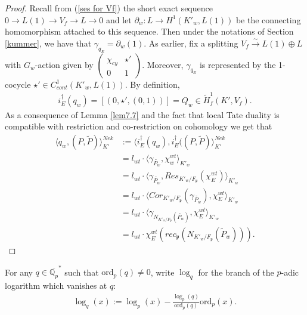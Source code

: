 \documentclass[reqno,10pt]{amsart}
\newcommand{\qp}{\mathbb{Q}_{p}}
\newcommand{\p}{\mathfrak{p}}
\theoremstyle{plain}
\theoremstyle{definition}
\begin{document}
\begin{proof}
    Recall from (\ref{ses for Vf}) the short exact sequence $0 \rightarrow L(1) \rightarrow V_f \rightarrow L \rightarrow 0$ and let $\partial_w : L \rightarrow H^1(K'_w,L(1))$ be the connecting homomorphism attached to this sequence. Then under the notations of Section \ref{kummer}, we have that $\gamma_{q_E} = \partial_w(1)$. As earlier, fix a splitting $V_f \xrightarrow{\sim} L(1) \oplus L$ with $G_w$-action given by
    $\begin{pmatrix}
        \chi_{cy} & \star' \\
        0 & 1
    \end{pmatrix}$.
    Moreover, $\gamma_{q_E}$ is represented by the 1-cocycle $\star' \in C^1_{cont}(K'_w,L(1))$. By definition,
    \begin{align*}
        i_E^\dagger(q_w) = [(0,\star',(0,1))] = Q_w \in \widetilde{H}^1_f(K',V_f).
    \end{align*}
     As a consequence of Lemma \ref{lem7.7} and the fact that local Tate duality is compatible with restriction and co-restriction on cohomology we get that
    \begin{align*}
        \langle q_w, (P,\widetilde{P}) \rangle^{Nek}_{K'} & := \langle i_E^\dagger(q_w), i_E^\dagger((P,\widetilde{P}) \rangle^{Nek}_{K'} \\
        & = l_{wt} \cdot \langle \gamma_{\widetilde{P_w}},\chi_w^{wt} \rangle_{K'_w} \\
        & = l_{wt} \cdot \langle \gamma_{\widetilde{P_w}},Res_{K'_w/F_\p}(\chi_E^{wt}) \rangle_{K'_w} \\
        & = l_{wt} \cdot \langle Cor_{K'_w/F_\p}(\gamma_{\widetilde{P_w}}),\chi_E^{wt} \rangle_{K'_w} \\
        & = l_{wt} \cdot \langle \gamma_{N_{K'_w/F_\p}(\widetilde{P_w})},\chi_E^{wt} \rangle_{K'_w} \\
        & = l_{wt} \cdot \chi_E^{wt}(rec_\p(N_{K'_w/F_\p}(\widetilde{P}_w))).
    \end{align*}
\end{proof}


For any $q \in \overline{\qp}^*$ such that $\mathrm{ord}_p(q) \neq 0$, write $\log_q$ for the branch of the $p$-adic logarithm which vanishes at $q$:
\begin{align*}
    \log_q(x) := \log_p(x) - \frac{\log_p(q)}{\mathrm{ord}_p(q)} \mathrm{ord}_p(x).
\end{align*}
\end{document}
